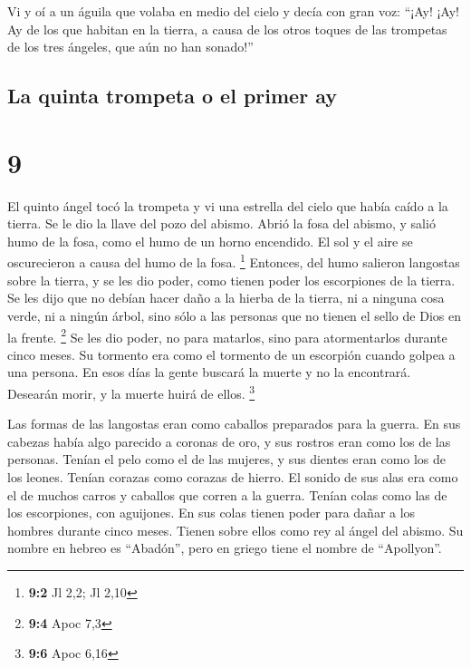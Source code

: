  Vi y oí a un águila que volaba en medio del cielo y
decía con gran voz: ``¡Ay! ¡Ay! Ay de los que habitan en la tierra, a
causa de los otros toques de las trompetas de los tres ángeles, que aún
no han sonado!''

\hypertarget{la-quinta-trompeta-o-el-primer-ay}{%
\subsection{La quinta trompeta o el primer
ay}\label{la-quinta-trompeta-o-el-primer-ay}}

\hypertarget{section-8}{%
\section{9}\label{section-8}}

 El quinto ángel tocó la trompeta y vi una estrella del
cielo que había caído a la tierra. Se le dio la llave del pozo del
abismo.  Abrió la fosa del abismo, y salió humo de la
fosa, como el humo de un horno encendido. El sol y el aire se
oscurecieron a causa del humo de la fosa. \footnote{\textbf{9:2} Jl 2,2;
  Jl 2,10}  Entonces, del humo salieron langostas sobre la
tierra, y se les dio poder, como tienen poder los escorpiones de la
tierra.  Se les dijo que no debían hacer daño a la hierba
de la tierra, ni a ninguna cosa verde, ni a ningún árbol, sino sólo a
las personas que no tienen el sello de Dios en la frente. \footnote{\textbf{9:4}
  Apoc 7,3}  Se les dio poder, no para matarlos, sino para
atormentarlos durante cinco meses. Su tormento era como el tormento de
un escorpión cuando golpea a una persona.  En esos días la
gente buscará la muerte y no la encontrará. Desearán morir, y la muerte
huirá de ellos. \footnote{\textbf{9:6} Apoc 6,16}

 Las formas de las langostas eran como caballos preparados
para la guerra. En sus cabezas había algo parecido a coronas de oro, y
sus rostros eran como los de las personas.  Tenían el pelo
como el de las mujeres, y sus dientes eran como los de los leones.
 Tenían corazas como corazas de hierro. El sonido de sus
alas era como el de muchos carros y caballos que corren a la guerra.
 Tenían colas como las de los escorpiones, con aguijones.
En sus colas tienen poder para dañar a los hombres durante cinco meses.
 Tienen sobre ellos como rey al ángel del abismo. Su
nombre en hebreo es ``Abadón'', pero en griego tiene el nombre de
``Apollyon''.

